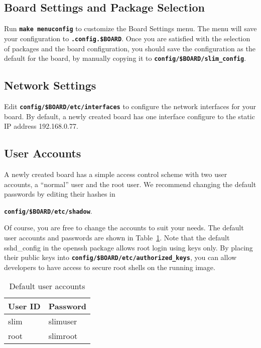 \documentclass[a4paper,10pt]{article}
\newenvironment{MyTable}{
 \bigskip
 \begin{table}[!hbp]\begin{center}
} {
 \end{center}\end{table}
}
\newcommand{\fw}{\tt\bf}
\begin{document}
\subsection{Board Settings and Package Selection}

   Run {\fw make menuconfig} to customize the Board Settings menu.
   The menu will save your configuration to {\fw .config.\$BOARD}.
   Once you are satisfied with the selection of packages and the board
   configuration, you should save the configuration as the default for
   the board, by manually copying it to {\fw config/\$BOARD/slim\_config}.

\subsection{Network Settings}

   Edit {\fw config/\$BOARD/etc/interfaces} to configure the network
   interfaces for your board. By default, a newly created board has
   one interface configure to the static IP address 192.168.0.77.

\subsection{User Accounts}

   A newly created board has a simple access control scheme with two
   user accounts, a ``normal'' user and the root user.  We recommend
   changing the default passwords by editing their hashes in

   {\fw config/\$BOARD/etc/shadow}.

   Of course, you are free to change the accounts to suit your needs.
   The default user accounts and passwords are shown in
   Table~\ref{Passwords}.
%
   Note that the default sshd\_config in the openssh package allows
   root login using keys only. By placing their public keys into
   {\fw config/\$BOARD/etc/authorized\_keys}, you can allow developers
   to have access to secure root shells on the running image.

   \begin{MyTable}
     \begin{tabular}{|l|l|} \hline
     User ID	& Password \\ \hline
     slim	& slimuser \\ \hline
     root	& slimroot \\ \hline
     \end{tabular}
     \caption{Default user accounts}\label{Passwords}
   \end{MyTable}
\end{document}
